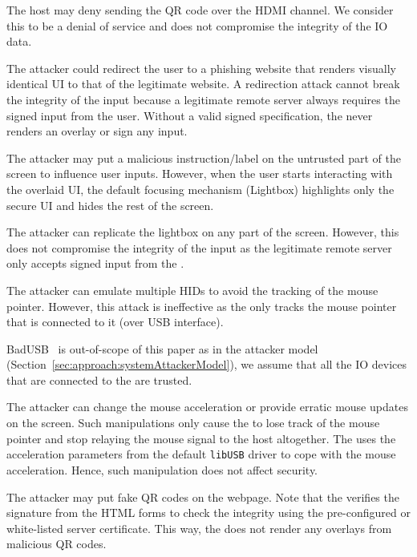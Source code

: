  The host may deny sending the QR code over the HDMI channel. We consider this to be a denial of service and does not compromise the integrity of the IO data. 


 The attacker could redirect the user to a phishing website that renders visually identical UI to that of the legitimate website. A redirection attack cannot break the integrity of the input because a legitimate remote server always requires the signed input from the user. Without a valid signed specification, the \device never renders an overlay or sign any input. 

 The attacker may put a malicious instruction/label on the untrusted part of the screen to influence user inputs. However, when the user starts interacting with the overlaid UI, the default focusing mechanism (Lightbox) highlights only the secure UI and hides the rest of the screen. 


 The attacker can replicate the lightbox on any part of the screen. However, this does not compromise the integrity of the input as the legitimate remote server only accepts signed input from the \device. 


 The attacker can emulate multiple HIDs to avoid the tracking of the mouse pointer. However, this attack is ineffective as the \device only tracks the mouse pointer that is connected to it (over USB interface). 


 BadUSB~\cite{badUSB} is out-of-scope of this paper as in the attacker model (Section~\ref{sec:approach:systemAttackerModel}), we assume that all the IO devices that are connected to the \device are trusted.

 The attacker can change the mouse acceleration or provide erratic mouse updates on the screen. Such manipulations only cause the \device to lose track of the mouse pointer and stop relaying the mouse signal to the host altogether. The \device uses the acceleration parameters from the default \texttt{libUSB} driver to cope with the mouse acceleration. Hence, such manipulation does not affect security.

 The attacker may put fake QR codes on the webpage. Note that the \device verifies the signature from the HTML forms to check the integrity using the pre-configured or white-listed server certificate. This way, the \device does not render any overlays from malicious QR codes.


